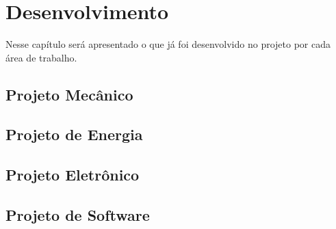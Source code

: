 \chapter{Desenvolvimento}
\label{chap:desenvolvimento}
	
	Nesse capítulo será apresentado o que já foi desenvolvido no projeto por cada área de trabalho.

	\section{Projeto Mecânico}
	\label{sec:desenvolvimento_mecanica}

		

	\newpage
	\section{Projeto de Energia}
	\label{sec:desenvolvimento_energia}

		

	\newpage
	\section{Projeto Eletrônico}
	\label{sec:desenvolvimento_eletronico}

		
	
	\newpage
	\section{Projeto de Software}
	\label{sec:desenvolvimento_ihc}

		
